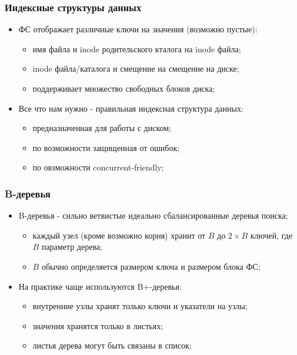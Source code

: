 \begin{frame}
\frametitle{Индексные структуры данных}
\begin{itemize}
  \item<1-> ФС отображает различные ключи на значения (возможно пустые):
    \begin{itemize}
      \item имя файла и inode родительского кталога на inode файла;
      \item inode файла/каталога и смещение на смещение на диске;
      \item поддерживает множество свободных блоков диска;
    \end{itemize}
  \item<2-> Все что нам нужно - правильная индексная структура данных:
    \begin{itemize}
      \item предназначенная для работы с диском;
      \item по возможности защищенная от ошибок;
      \item по овзможности concurrent-friendly;
    \end{itemize}
\end{itemize}
\end{frame}

\begin{frame}
\frametitle{B-деревья}
\begin{itemize}
  \item<1-> B-деревья - сильно ветвистые идеально сбалансированные деревья поиска;
    \begin{itemize}
      \item каждый узел (кроме возможно корня) хранит от $B$ до $2 \times B$ ключей, где $B$ параметр дерева;
      \item $B$ обычно определяется размером ключа и размером блока ФС;
    \end{itemize}
  \item<2-> На практике чаще используются B+-деревья:
    \begin{itemize}
      \item внутренние узлы хранят только ключи и указатели на узлы;
      \item значения хранятся только в листьях;
      \item листья дерева могут быть связаны в список;
    \end{itemize}
\end{itemize}
\end{frame}

